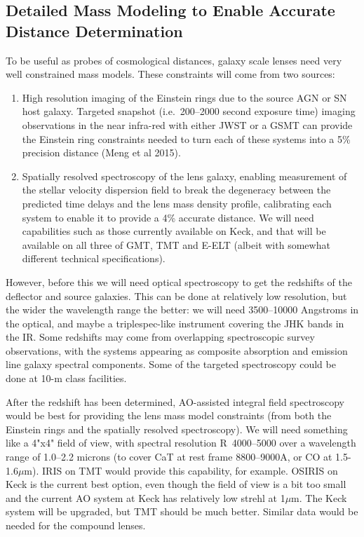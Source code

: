 
\subsection{Detailed Mass Modeling to Enable Accurate Distance Determination}

To be useful as probes of cosmological distances, galaxy scale lenses
need very well constrained mass models. These constraints will come from
two sources:
\begin{enumerate}
    \item High resolution imaging of the Einstein rings due to the
    source AGN or SN host galaxy. Targeted snapshot (i.e.\ 200--2000
    second exposure time) imaging observations in the near infra-red
    with either JWST or a GSMT can provide the Einstein ring constraints
    needed to turn each of these systems into a  5\% precision distance
    (Meng et al 2015).
    \item Spatially resolved spectroscopy of the lens galaxy, enabling
    measurement of the stellar velocity dispersion field to break the
    degeneracy between the predicted time delays and the lens mass
    density profile, calibrating each system to enable it to provide a
    4\% accurate distance. We will need capabilities such as those
    currently available on Keck, and that will be available on all three
    of GMT, TMT and E-ELT (albeit with somewhat different technical
    specifications).
\end{enumerate}

However, before this we will need optical spectroscopy to get the
redshifts of the deflector and source galaxies. This can be done at
relatively low resolution, but the wider the wavelength range the
better: we will need 3500--10000 Angstroms in the optical, and maybe a
triplespec-like instrument covering the JHK bands in the IR. Some
redshifts may come from overlapping spectroscopic survey observations,
with the systems appearing as composite absorption and emission line
galaxy spectral components. Some of the targeted spectroscopy could be
done at 10-m class facilities.

After the redshift has been determined, AO-assisted integral field
spectroscopy would be best for providing the lens mass model constraints
(from both the Einstein rings and the spatially resolved spectroscopy).
We will need something like a 4"x4" field of view, with spectral
resolution R~4000--5000 over a wavelength range of 1.0--2.2 microns (to
cover CaT at rest frame  8800--9000A, or CO at 1.5-1.6$\mu$m). IRIS on
TMT would provide this capability, for example. OSIRIS on Keck is the
current best option, even though the field of view is a bit too small
and the current AO system at Keck has relatively low strehl at 1$\mu$m.
The Keck system will be upgraded, but TMT should be much better. Similar
data would be needed for the compound lenses.

